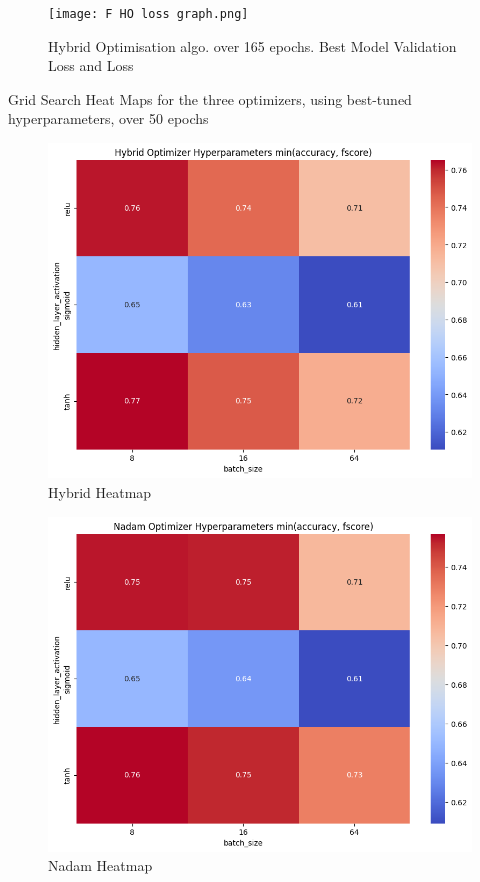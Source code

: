 \documentclass[conference]{IEEEtran}
\begin{document}
\FloatBarrier

\begin{figure}[htbp]
\centerline{\texttt{[image: F HO loss graph.png]}}
\caption{Hybrid Optimisation algo. over 165 epochs. Best Model Validation Loss and Loss}
\label{fig:F HO loss graph}
\end{figure}

\FloatBarrier

\newpage

Grid Search Heat Maps for the three optimizers, using best-tuned hyperparameters, over 50 epochs

\begin{figure}[htbp]
\centerline{\includegraphics[width=0.8\columnwidth]{Fs HO GS HM acc.png}}
\caption{Hybrid Heatmap}
\label{fig:Fs HO GS HM acc}
\end{figure}

\FloatBarrier

\begin{figure}[htbp]
\centerline{\includegraphics[width=0.8\columnwidth]{Fs Nadam GS HM acc.png}}
\caption{Nadam Heatmap}
\label{fig:Fs Nadam GS HM acc}
\end{figure}
\end{document}
